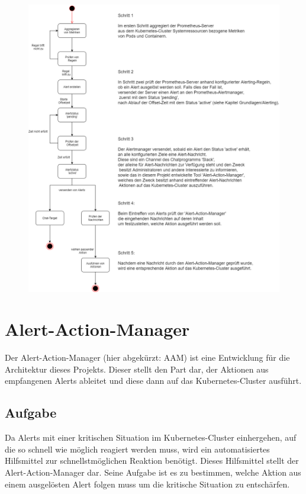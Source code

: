 \documentclass[a4paper,10pt]{scrartcl}
\begin{document}
\begin{figure}[htbp]
  \includegraphics[scale=1,width=1.1\textwidth]{AAMStateChart.png}
\end{figure}

\pagebreak

\section{Alert-Action-Manager}

Der Alert-Action-Manager (hier abgekürzt: AAM) ist eine Entwicklung für die Architektur dieses Projekts. Dieser stellt den Part dar, der Aktionen aus empfangenen Alerts ableitet und diese dann auf das Kubernetes-Cluster ausführt.\\

\subsection{Aufgabe}

Da Alerts mit einer kritischen Situation im Kubernetes-Cluster einhergehen, auf die so schnell wie möglich reagiert werden muss, wird ein automatisiertes Hilfsmittel zur schnellstmöglichen Reaktion benötigt. Dieses Hilfsmittel stellt der Alert-Action-Manager dar. Seine Aufgabe ist es zu bestimmen, welche Aktion aus einem ausgelösten Alert folgen muss um die kritische Situation zu entschärfen.\\
\end{document}
